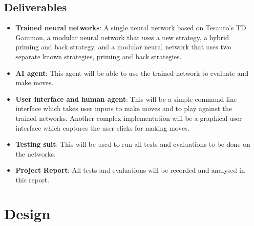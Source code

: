 \documentclass[12pt,a4paper]{article}
\begin{document}
\subsection{Deliverables}
\begin{itemize}
    \item \textbf{Trained neural networks}: A single neural network based on Tesauro's TD Gammon, a modular neural network that uses a new strategy, a hybrid priming and back strategy, and a modular neural network that uses two separate known strategies, priming and back strategies.
    \item \textbf{AI agent}: This agent will be able to use the trained network to evaluate and make moves.
    \item \textbf{User interface and human agent}: This will be a simple command line interface which takes user inputs to make moves and to play against the trained networks. Another complex implementation will be a graphical user interface which captures the user clicks for making moves.
    \item \textbf{Testing suit}: This will be used to run all tests and evaluations to be done on the networks.
    \item \textbf{Project Report}: All tests and evaluations will be recorded and analysed in this report.
\end{itemize}

\pagebreak

\section{Design}
\end{document}
